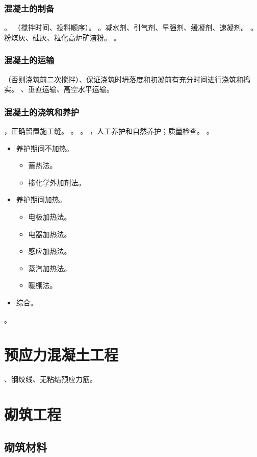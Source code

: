 \documentclass{book}
\begin{document}
\subsection{混凝土的制备}
。
（搅拌时间、投料顺序）。
。减水剂、引气剂、早强剂、缓凝剂、速凝剂。
。粉煤灰、硅灰、粒化高炉矿渣粉。
。
\subsection{混凝土的运输}
（否则浇筑前二次搅拌）、保证浇筑时坍落度和初凝前有充分时间进行浇筑和捣实。
、垂直运输、高空水平运输。
\subsection{混凝土的浇筑和养护}
，正确留置施工缝。
。
。
，人工养护和自然养护；质量检查。
。
\begin{itemize}
    \item 养护期间不加热。
          \begin{itemize}
              \item 蓄热法。
              \item 掺化学外加剂法。
          \end{itemize}
    \item 养护期间加热。
          \begin{itemize}
              \item 电极加热法。
              \item 电器加热法。
              \item 感应加热法。
              \item 蒸汽加热法。
              \item 暖棚法。
          \end{itemize}
    \item 综合。
\end{itemize}
。
\chapter{预应力混凝土工程}
、钢绞线、无粘结预应力筋。
\chapter{砌筑工程}
\section{砌筑材料}
\end{document}
